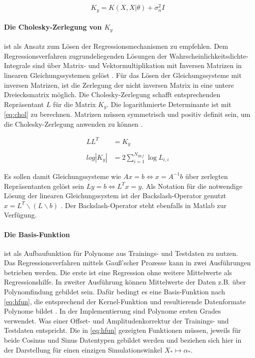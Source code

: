 \begin{equation}\label{eq:addnoise}
	K_y = K(X, X|\theta) + \sigma_n^2 I
\end{equation}


\paragraph*{Die Cholesky-Zerlegung von $K_y$} ist als Ansatz zum Lösen der Regressionsmechanismen zu empfehlen. Dem Regressionsverfahren zugrundeliegenden Lösungen der Wahrscheinlichkeitsdichte-Integrale sind über Matrix- und Vektormultiplikation mit Inversen Matrizen in linearen Gleichungssystemen gelöst \cite{Rasmussen2006}. Für das Lösen der Gleichungssysteme mit inversen Matrizen, ist die Zerlegung der nicht inversen Matrix in eine untere Dreiecksmatrix möglich. Die Cholesky-Zerlegung schafft entsprechenden Repräsentant $L$ für die Matrix $K_y$. Die logarithmierte Determinante ist mit \autoref{eq:chol} zu berechnen. Matrizen müssen symmetrisch und positiv definit sein, um die Cholesky-Zerlegung anwenden zu können \cite{Rasmussen2006}.


\begin{align}\label{eq:chol}
		 LL^T &= K_y  \nonumber \\
		 \\
	log |K_y| &= 2 \sum_{i=1}^{N_{Ref}} \log L_{i,i} \nonumber
\end{align}


Es sollen damit Gleichungssysteme wie $Ax = b \Leftrightarrow x = A^{-1}b$ über zerlegten Repräsentanten gelöst sein $Ly = b \Leftrightarrow L^Tx = y$. Als Notation für die notwendige Lösung der linearen Gleichungssystem ist der Backslash-Operator genutzt $x = L^T \backslash (L \backslash b)$ \cite{Rasmussen2006}. Der Backslash-Operator steht ebenfalls in Matlab zur Verfügung.


\clearpage


\paragraph*{Die Basis-Funktion} ist als Aufbaufunktion für Polynome aus Trainings- und Testdaten zu nutzen. Das Regressionsverfahren mittels Gauß'scher Prozesse kann in zwei Ausführungen betrieben werden. Die erste ist eine Regression ohne weitere Mittelwerte als Regressionshilfe. In zweiter Ausführung können Mittelwerte der Daten z.B. über Polynomfindung gebildet sein. Dafür bedingt es eine Basis-Funktion nach \autoref{eq:hfun}, die entsprechend der Kernel-Funktion und resultierende Datenformate Polynome bildet \cite{Rasmussen2006}. In der Implementierung sind Polynome ersten Grades verwendet. Was einer Offset- und Amplitudenkorrektur der Trainings- und Testdaten entspricht. Die in \autoref{eq:hfun} gezeigten Funktionen müssen, jeweils für beide Cosinus und Sinus Datentypen gebildet werden und beziehen sich hier in der Darstellung für einen einzigen Simulationswinkel $X_* \mapsto \alpha_*$.


